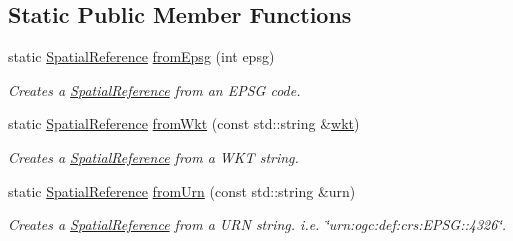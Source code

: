 \subsection*{Static Public Member Functions}
\begin{DoxyCompactItemize}
\item 
static \hyperlink{classdg_1_1deepcore_1_1geometry_1_1_spatial_reference}{Spatial\+Reference} \hyperlink{group___imagery_module_ga4ef6ea29f2717ed5572522fe50b23d99}{from\+Epsg} (int epsg)
\begin{DoxyCompactList}\small\item\em Creates a \hyperlink{classdg_1_1deepcore_1_1geometry_1_1_spatial_reference}{Spatial\+Reference} from an E\+P\+SG code. \end{DoxyCompactList}\item 
static \hyperlink{classdg_1_1deepcore_1_1geometry_1_1_spatial_reference}{Spatial\+Reference} \hyperlink{group___imagery_module_gaffb292540698074ced3a1dbe8ce7ba64}{from\+Wkt} (const std\+::string \&\hyperlink{group___imagery_module_ga82c05ce0a6e02aa7cec17a68131b5263}{wkt})
\begin{DoxyCompactList}\small\item\em Creates a \hyperlink{classdg_1_1deepcore_1_1geometry_1_1_spatial_reference}{Spatial\+Reference} from a W\+KT string. \end{DoxyCompactList}\item 
static \hyperlink{classdg_1_1deepcore_1_1geometry_1_1_spatial_reference}{Spatial\+Reference} \hyperlink{group___imagery_module_ga926f04f2b75c645a6fcd732c85de507f}{from\+Urn} (const std\+::string \&urn)
\begin{DoxyCompactList}\small\item\em Creates a \hyperlink{classdg_1_1deepcore_1_1geometry_1_1_spatial_reference}{Spatial\+Reference} from a U\+RN string. i.\+e. \char`\"{}urn\+:ogc\+:def\+:crs\+:\+E\+P\+S\+G\+::4326\char`\"{}. \end{DoxyCompactList}\end{DoxyCompactItemize}
